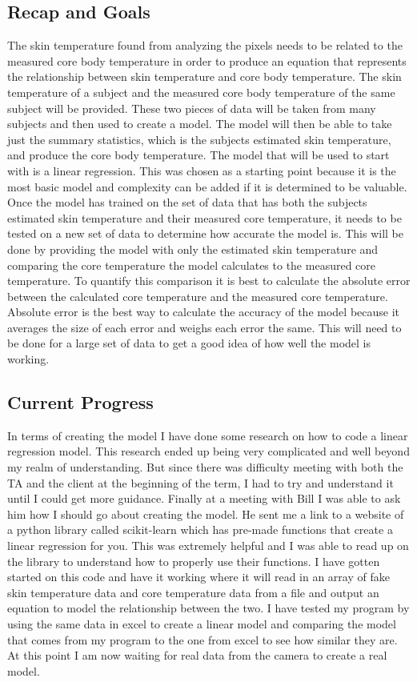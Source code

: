\documentclass[onecolumn, draftclsnofoot,10pt, compsoc]{IEEEtran}
\begin{document}
\subsection{Recap and Goals}
		The skin temperature found from analyzing the pixels needs to be related to the measured core body temperature in order to produce an equation that represents the relationship between skin temperature and core body temperature. The skin temperature of a subject and the measured core body temperature of the same subject will be provided. These two pieces of data will be taken from many subjects and then used to create a model. The model will then be able to take just the summary statistics, which is the subjects estimated skin temperature, and produce the core body temperature. The model that will be used to start with is a linear regression. This was chosen as a starting point because it is the most basic model and complexity can be added if it is determined to be valuable.
        Once the model has trained on the set of data that has both the subjects estimated skin temperature and their measured core temperature, it needs to be tested on a new set of data to determine how accurate the model is. This will be done by providing the model with only the estimated skin temperature and comparing the core temperature the model calculates to the measured core temperature. To quantify this comparison it is best to calculate the absolute error between the calculated core temperature and the measured core temperature. Absolute error is the best way to calculate the accuracy of the model because it averages the size of each error and weighs each error the same. This will need to be done for a large set of data to get a good idea of how well the model is working. \cite{BiancaTech}



\subsection{Current Progress}

In terms of creating the model I have done some research on how to code a linear regression model. This research ended up being very complicated and well beyond my realm of understanding. But since there was difficulty meeting with both the TA and the client at the beginning of the term, I had to try and understand it until I could get more guidance. Finally at a meeting with Bill I was able to ask him how I should go about creating the model. He sent me a link to a website of a python library called scikit-learn which has pre-made functions that create a linear regression for you. This was extremely helpful and I was able to read up on the library to understand how to properly use their functions. I have gotten started on this code and have it working where it will read in an array of fake skin temperature data and core temperature data from a file and output an equation to model the relationship between the two. I have tested my program by using the same data in excel to create a linear model and comparing the model that comes from my program to the one from excel to see how similar they are. At this point I am now waiting for real data from the camera to create a real model.
\end{document}
